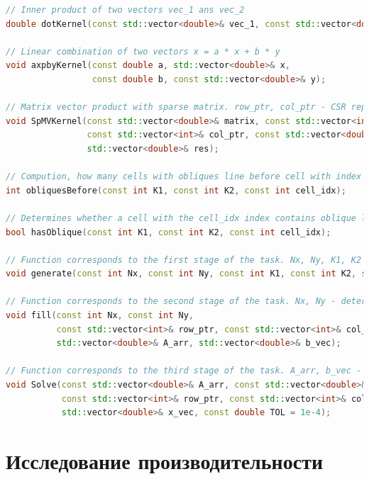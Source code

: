 	\begin{lstlisting}[numbersep=10pt, language=C++, caption=\textbf{Реализованные функции}]
// Inner product of two vectors vec_1 ans vec_2
double dotKernel(const std::vector<double>& vec_1, const std::vector<double>& vec_2);

// Linear combination of two vectors x = a * x + b * y
void axpbyKernel(const double a, std::vector<double>& x,
	             const double b, const std::vector<double>& y);

// Matrix vector product with sparse matrix. row_ptr, col_ptr - CSR representation, res = Matrix * vec
void SpMVKernel(const std::vector<double>& matrix, const std::vector<int>& row_ptr,
	            const std::vector<int>& col_ptr, const std::vector<double>& vec,
	            std::vector<double>& res);

// Compution, how many cells with obliques line before cell with index cell_idx, K1, K2 - parameters that determine the distribution of oblique lines
int obliquesBefore(const int K1, const int K2, const int cell_idx);

// Determines whether a cell with the cell_idx index contains oblique line,  K1, K2 - parameters that determine the distribution of oblique lines
bool hasOblique(const int K1, const int K2, const int cell_idx);

// Function corresponds to the first stage of the task. Nx, Ny, K1, K2 - determine the configuration of a two-dimensional grid, row_ptr, col_ptr - CSR representation
void generate(const int Nx, const int Ny, const int K1, const int K2, std::vector<int>& row_ptr, std::vector<int>& col_ptr);

// Function corresponds to the second stage of the task. Nx, Ny - determine grid size, row_ptr, col_ptr - CSR representation, A_arr, b_vec - fillable matrix and vector
void fill(const int Nx, const int Ny,
	      const std::vector<int>& row_ptr, const std::vector<int>& col_ptr,
	      std::vector<double>& A_arr, std::vector<double>& b_vec);

// Function corresponds to the third stage of the task. A_arr, b_vec - initial data for solving systems of linear equations, row_ptr, col_ptr - CSR representation, x_vec - equations solution, TOL - relative error of the solution
void Solve(const std::vector<double>& A_arr, const std::vector<double>& b_vec,
	       const std::vector<int>& row_ptr, const std::vector<int>& col_ptr,
	       std::vector<double>& x_vec, const double TOL = 1e-4);
	\end{lstlisting}
\section{Исследование производительности}
